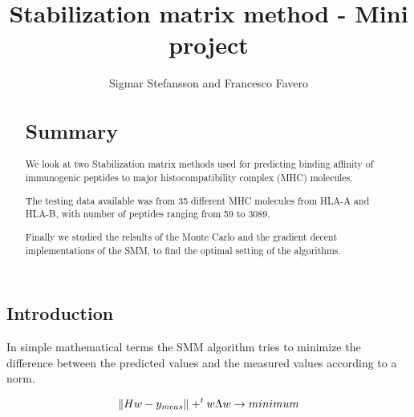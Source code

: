 \documentclass{bioinfo}
\begin{document}
\begin{application}

\title[SMM Project]{Stabilization matrix method - Mini project}
\author[Sigmar Stefansson, Francesco Favero]{Sigmar Stefansson and Francesco Favero}
\address{Danmarks Tekniske Univeristet}



\maketitle

\begin{abstract}

\section{Summary}
We look at two Stabilization matrix methods \cite{SMM} used for predicting binding \cite{netMHC} affinity of immunogenic peptides to major histocompatibility complex \cite{wiki:MHC} (MHC) molecules.
\par The testing data available was from 35 different MHC molecules from HLA-A and HLA-B, with number of peptides ranging from 59 to 3089.
\par Finally we studied the relsults of the Monte Carlo and the gradient decent implementations of the SMM, to find the optimal setting of the algorithms.

\end{abstract}

\section*{Introduction}

In simple mathematical terms the SMM algorithm tries to minimize the difference between the predicted values and the measured values according to a norm.

\begin{equation}
\label{eq:01}
\| H w - y_{meas}\| + ^tw \Lambda w \rightarrow minimum \\
\end{equation}


\end{application}
\end{document}
